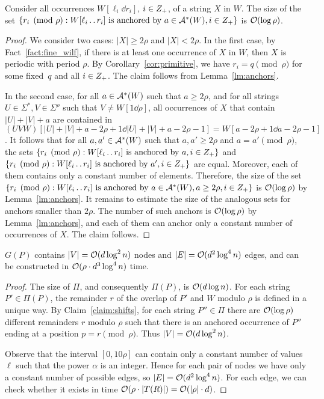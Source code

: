 \begin{claim}\label{claim:shifts}
Consider all occurrences $W[\ell_i \dd r_i]$, $i \in Z_+$, of a string $X$ in $W$. The size of the set $\{r_i \pmod \rho : W[\ell_i \mathinner{.\,.\allowbreak} r_i] \text{ is anchored by } a\in \mathcal{A}^\ast(W), i \in Z_+\}$ is $\mathcal{O}(\log \rho)$.
\end{claim}
\begin{proof}
We consider two cases: $|X| \ge 2\rho$ and $|X| < 2\rho$. In the first case, by Fact~\ref{fact:fine_wilf}, if there is at least one occurrence of $X$ in $W$, then $X$ is periodic with period $\rho$. By Corollary~\ref{cor:primitive}, we have $r_i = q \pmod{\rho}$ for some fixed~$q$ and all $i \in Z_+$. The claim follows from Lemma~\ref{lm:anchors}. 

In the second case, for all $a \in \mathcal{A}^\ast(W)$ such that $a \ge 2\rho$, and for all strings $U \in \Sigma^\ast, V \in \Sigma^\rho$ such that $V \neq W[1 \dd \rho]$, all occurrences of $X$ that contain $|U|+|V|+a$ are contained in $(UVW)[|U|+|V|+a-2\rho+1 \dd |U|+|V|+a-2\rho-1] = W[a-2\rho+1 \dd a-2\rho-1]$. It follows that for all $a,a' \in \mathcal{A}^\ast(W)$ such that $a,a' \ge 2\rho$ and $a = a' \pmod {\rho}$, the sets $\{r_i \pmod {\rho} : W[\ell_i \mathinner{.\,.\allowbreak} r_i] \text{ is anchored by } a, i \in Z_+\}$ and $\{r_i \pmod {\rho} : W[\ell_i \mathinner{.\,.\allowbreak} r_i] \text{ is anchored by } a', i \in Z_+\}$ are equal. Moreover, each of them contains only a constant number of elements. Therefore, the size of the set $\{r_i \pmod  {\rho} : W[\ell_i \mathinner{.\,.\allowbreak} r_i] \text{ is anchored by } a\in \mathcal{A}^\ast(W), a \ge 2\rho, i \in Z_+\}$ is $\mathcal{O}(\log \rho)$ by Lemma~\ref{lm:anchors}. It remains to estimate the size of the analogous sets for anchors smaller than $2\rho$. The number of such anchors is $\mathcal{O}(\log \rho)$ by Lemma~\ref{lm:anchors}, and each of them can anchor only a constant number of occurrences of $X$. The claim follows.
\end{proof}

\begin{corollary}\label{cor:size_of_G}
$G(P)$ contains $|V| = \mathcal{O}(d \log^2 n)$ nodes and $|E| = \mathcal{O}(d^2 \log^4 n)$ edges, and can be constructed in $\mathcal{O}(\rho \cdot d^3 \log^4 n)$ time.
\end{corollary}
\begin{proof}
The size of $\Pi$, and consequently $\Pi(P)$, is $\mathcal{O}(d \log n)$.
For each string $P' \in \Pi(P)$, the remainder $r$ of the overlap of $P'$ and $W$ modulo $\rho$ is defined in a unique way.
By Claim~\ref{claim:shifts}, for each string $P'' \in \Pi$ there are $\mathcal{O}(\log \rho)$ different remainders $r$ modulo $\rho$ such that there is an anchored occurrence of $P''$ ending at a position $p = r \pmod \rho$.
Thus $|V| = \mathcal{O}(d \log^2 n)$.

Observe that the interval $[0, 10\rho]$ can contain only a constant number of values $\ell$ such that the power $\alpha$ is an integer.
Hence for each pair of nodes we have only a constant number of possible edges, so $|E| = \mathcal{O}(d^2 \log^4 n)$.
For each edge, we can check whether it exists in time $\mathcal{O}(\rho \cdot |T(R)|) = \mathcal{O}(|\rho| \cdot d)$.
\end{proof}

